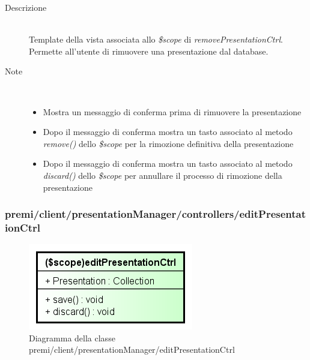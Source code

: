 \begin{description}
\item[Descrizione] \hfill \\
	Template della vista associata allo \textit{\$scope} di \textit{removePresentationCtrl}. Permette all'utente di rimuovere una presentazione dal database.
\item[Note] \hfill \\
	\begin{itemize}
			\item Mostra un messaggio di conferma prima di rimuovere la presentazione
			\item Dopo il messaggio di conferma mostra un tasto associato al metodo \textit{remove()} dello \textit{\$scope} per la rimozione definitiva della presentazione
			\item Dopo il messaggio di conferma mostra un tasto associato al metodo \textit{discard()} dello \textit{\$scope} per annullare il processo di rimozione della presentazione
	\end{itemize}
\end{description}





























\subsubsection{premi/client/presentationManager/controllers/editPresentationCtrl}
\begin{figure}[h]
\begin{center}
\includegraphics[scale=0.90]{img/diacla/editPresentationCtrl.png}
\caption{Diagramma della classe premi/client/presentationManager/editPresentationCtrl}
\end{center}
\end{figure}

